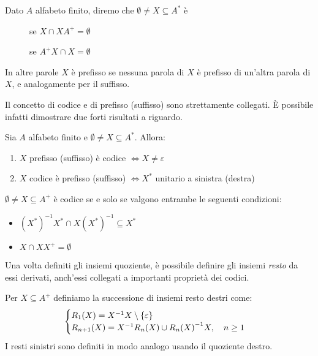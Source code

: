 \begin{definition}
  Dato \(A\) alfabeto finito, diremo che \(\emptyset \neq X \subseteq A^*\) è
  \begin{description}
    \item[] se \(X\cap XA^+ = \emptyset\)
    \item[] se \(A^+X \cap X = \emptyset\)
  \end{description}
\end{definition}

In altre parole \(X\) è prefisso se nessuna parola di \(X\) è prefisso di un'altra parola di \(X\), e analogamente per il suffisso.

Il concetto di codice e di prefisso (suffisso) sono strettamente collegati.
È possibile infatti dimostrare due forti risultati a riguardo.
\begin{theorem}
  Sia \(A\) alfabeto finito e \(\emptyset \neq X \subseteq A^*\).
  Allora:
  \begin{enumerate}
    \item \(X\) prefisso (suffisso) è codice \(\iff X \neq {\varepsilon}\)
    \item \(X\) codice è prefisso (suffisso) \(\iff X^*\) unitario a sinistra (destra)
  \end{enumerate}
\end{theorem}

\begin{corollary}
  \(\emptyset \neq X \subseteq A^+\) è codice se e solo se valgono entrambe le seguenti condizioni:
  \begin{itemize}
    \item \({(X^*)}^{-1}X^* \cap X{(X^*)}^{-1} \subseteq X^* \)
    \item \(X \cap XX^+ = \emptyset\)
  \end{itemize}
\end{corollary}

Una volta definiti gli insiemi quoziente, è possibile definire gli insiemi \emph{resto} da essi derivati, anch'essi collegati a importanti proprietà dei codici.
\begin{definition}
  Per \(X \subseteq A^+\) definiamo la successione di insiemi resto destri come:
  \begin{equation}
    \begin{cases}
      R_1(X) = X^{-1}X\setminus \set{\varepsilon} \\
      R_{n+1}(X) =X^{-1} R_n(X) \cup {R_n(X)}^{-1}X, \quad n \geq 1\\
    \end{cases}
  \end{equation}
  I resti sinistri sono definiti in modo analogo usando il quoziente destro.
\end{definition}

